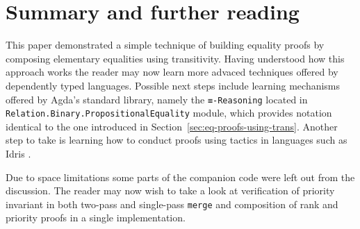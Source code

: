 \section{Summary and further reading}

This paper demonstrated a simple technique of building equality proofs by composing elementary equalities using transitivity. Having understood how this approach works the reader may now learn more advaced techniques offered by dependently typed languages. Possible next steps include learning mechanisms offered by Agda's standard library, namely the \texttt{≡-Reasoning} located in \texttt{Relation.}\texttt{Binary.}\texttt{PropositionalEquality} module, which provides notation identical to the one introduced in Section~\ref{sec:eq-proofs-using-trans}. Another step to take is learning how to conduct proofs using tactics in languages such as Idris \cite{Bra13}.

Due to space limitations some parts of the companion code were left out from the discussion. The reader may now wish to take a look at verification of priority invariant in both two-pass and single-pass \texttt{merge} and composition of rank and priority proofs in a single implementation.
